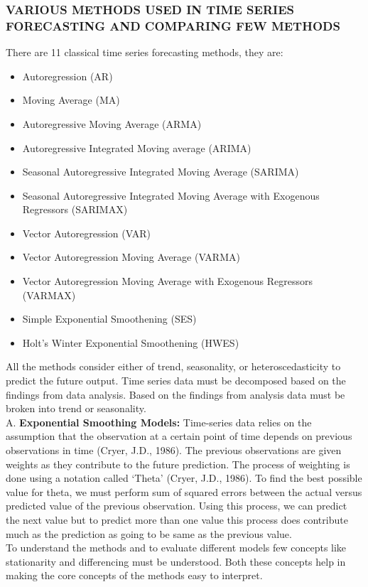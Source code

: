 \documentclass[12pt,a4paper]{article}
\begin{document}
\begin{flushleft}
		\subsubsection{VARIOUS METHODS USED IN TIME SERIES FORECASTING AND COMPARING FEW METHODS}
		There are 11 classical time series forecasting methods, they are:
		\begin{itemize}
		\item	Autoregression (AR)
		\item	Moving Average (MA)
		\item	Autoregressive Moving Average (ARMA)
		\item	Autoregressive Integrated Moving average (ARIMA)
		\item	Seasonal Autoregressive Integrated Moving Average (SARIMA)
		\item	Seasonal Autoregressive Integrated Moving Average with Exogenous Regressors (SARIMAX)
		\item	Vector Autoregression (VAR)
		\item	Vector Autoregression Moving Average (VARMA)
		\item	Vector Autoregression Moving Average with Exogenous Regressors (VARMAX)
		\item	Simple Exponential Smoothening (SES)
		\item	Holt’s Winter Exponential Smoothening (HWES)
		\end{itemize}
		All the methods consider either of trend, seasonality, or heteroscedasticity to predict the future output. Time series data must be decomposed based on the findings from data analysis. Based on the findings from analysis data must be broken into trend or seasonality.\\
		A.	\textbf{Exponential Smoothing Models:}
		Time-series data relies on the assumption that the observation at a certain point of time depends on previous observations in time (Cryer, J.D., 1986). The previous observations are given weights as they contribute to the future prediction. The process of weighting is done using a notation called ‘Theta’ (Cryer, J.D., 1986). To find the best possible value for theta, we must perform sum of squared errors between the actual versus predicted value of the previous observation. Using this process, we can predict the next value but to predict more than one value this process does contribute much as the prediction as going to be same as the previous value.\\
		To understand the methods and to evaluate different models few concepts like stationarity and differencing must be understood. Both these concepts help in making the core concepts of the methods easy to interpret. \\

\end{flushleft}
\end{document}
